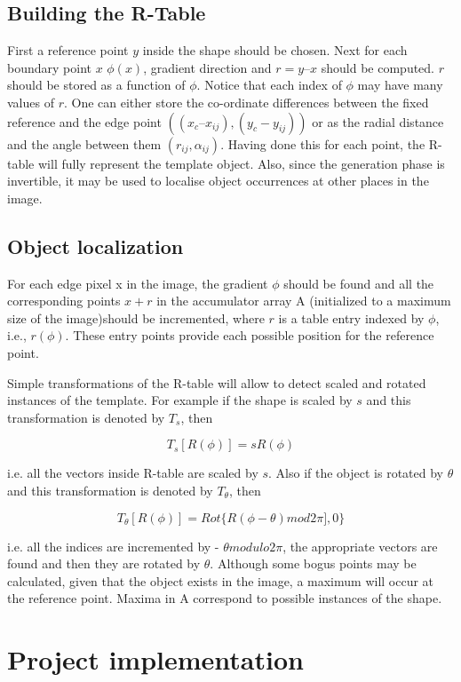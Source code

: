 \documentclass[letterpaper,12pt]{article}
\begin{document}
\subsection{Building the R-Table}

First a reference point $y$ inside the shape should be chosen. Next for each boundary point $x$ $\phi(x)$, gradient direction and $r = y – x$ should be computed. $r$ should be stored as a function of $\phi$. Notice that each index of $\phi$ may have many values of $r$. One can either store the co-ordinate differences between the fixed reference and the edge point $((x_c – x_{ij}),( y_c - y_{ij}))$ or as the radial distance and the angle between them $(r_{ij} , \alpha_{ij})$. Having done this for each point, the R-table will fully represent the template object. Also, since the generation phase is invertible, it may be used to localise object occurrences at other places in the image.


\subsection{Object localization}

For each edge pixel x in the image, the gradient $\phi$  should be found and all the corresponding points $x+r$ in the accumulator array A (initialized to a maximum size of the image)should be incremented, where $r$ is a table entry indexed by $\phi$, i.e., $r(\phi)$. These entry points provide each possible position for the reference point. 

Simple transformations of the R-table will allow to detect scaled and rotated instances of the template. For example if the shape is scaled by $s$ and this transformation is denoted by $T_s$, then

\[T_s[R(\phi)]=sR(\phi) \]

i.e. all the vectors inside R-table are scaled by $s$. Also if the object is rotated by $\theta$ and this transformation is denoted by $T_\theta$, then

\[T_\theta[R(\phi)]=Rot\{R(\phi-\theta)mod2\pi],0\} \]

i.e. all the indices are incremented by - $\theta 
 modulo 2\pi$, the appropriate vectors are found and then they are rotated by $\theta$. 
Although some bogus points may be calculated, given that the object exists in the image, a maximum will occur at the reference point. Maxima in A correspond to possible instances of the shape.

\section{Project implementation}
\end{document}
